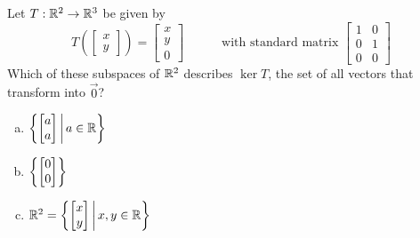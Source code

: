 \begin{activity}{5}
Let \(T: \mathbb{R}^2 \rightarrow \mathbb{R}^3\) be given by
\[
  T\left(\begin{bmatrix}x \\ y \end{bmatrix} \right)
    =
  \begin{bmatrix} x \\ y \\ 0 \end{bmatrix}
    \hspace{3em}
    \text{with standard matrix }
  \begin{bmatrix} 1 & 0 \\ 0 & 1 \\ 0 & 0 \end{bmatrix}
\]
Which of these subspaces of \(\mathbb{R}^2\) describes \(\ker T\),
the set of all vectors that transform into \(\vec 0\)?
\begin{enumerate}[a)]
\item \(\left\{\begin{bmatrix}a \\ a\end{bmatrix}\,\middle|\,a\in\mathbb{R}\right\}\)
\item \(\left\{\begin{bmatrix}0\\0\end{bmatrix}\right\}\)
\item \(\mathbb{R}^2=\left\{\begin{bmatrix}x \\ y\end{bmatrix}\,\middle|\,x,y\in\mathbb{R}\right\}\)
\end{enumerate}
\end{activity}


